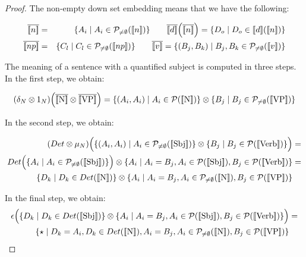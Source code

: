 \begin{proof}
The non-empty down set embedding means that we have the following: 

\begin{eqnarray*}
\overline{\semantics{{n}}} &=& \{A_i \mid A_i \in {\cal P}_{\neq \emptyset}(\semantics{{n}})\} \qquad 
\overline{\semantics{d}}\Big(\overline{\semantics{{n}}}\Big) = \{D_o \mid D_o \in {\semantics{d}}(\semantics{{n}})\}\\
\overline{\semantics{{np}}} &=& \{C_l \mid C_l \in {\cal P}_{\neq \emptyset}(\semantics{{np}})\} \qquad 
\overline{\semantics{{v}}} = \{(B_j, B_k) \mid B_j, B_k  \in {\cal P}_{\neq \emptyset}(\semantics{{v}})\}\\
\end{eqnarray*}

\noindent
The meaning of a sentence with a quantified subject is computed in three steps. In the  first step, we obtain:

\begin{align*}
(\delta_N \otimes 1_{N})\Big(\overline{\semantics{\text{N}}} \otimes \overline{\semantics{\text{VP}}}\Big) =  \{(A_i, A_i) \mid A_i \in {\cal P} (\semantics{\text{N}})\} \otimes \{B_j \mid B_j \in  {\cal P}_{\neq \emptyset} (\semantics{\text{VP}})\}
\end{align*}


\noindent
In the second step, we obtain:

\begin{align*}
(Det \otimes  \mu_N)\Big(\{(A_i, A_i) \mid A_i \in {\cal P}_{\neq \emptyset} (\semantics{\text{Sbj}})\} \otimes \{B_j \mid B_j \in  {\cal P} (\semantics{\text{Verb}})\}\Big) &=\\
Det\Big(\{A_i \mid A_i \in {\cal P}_{\neq \emptyset} (\semantics{\text{Sbj}})\}\Big) \otimes \{A_i \mid A_i = B_j, A_i \in {\cal P} (\semantics{\text{Sbj}}), B_j \in  {\cal P}(\semantics{\text{Verb}})\} &=\\
\{D_k \mid D_k \in Det(\semantics{\text{N}})\} \otimes \{A_i \mid A_i = B_j, A_i \in {\cal P}_{\neq \emptyset} (\semantics{\text{N}}), B_j \in  {\cal P}(\semantics{\text{VP}})\}
\end{align*}

\noindent
In the final step, we obtain:
\begin{align*}
\epsilon\Big(\{D_k \mid D_k \in Det(\semantics{\text{Sbj}})\} \otimes \{A_i \mid A_i = B_j, A_i \in {\cal P} (\semantics{\text{Sbj}}), B_j \in  {\cal P}(\semantics{\text{Verb}})\}\Big) &=\\
 \{\star \mid  D_k = A_i, D_k \in Det(\semantics{\text{N}}), A_i = B_j, A_i \in {\cal P}_{\neq \emptyset} (\semantics{\text{N}}), B_j \in  {\cal P} (\semantics{\text{VP}})\}
\end{align*}
\end{proof}





